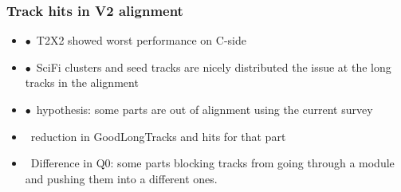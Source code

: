 \documentclass[aspectratio=1610, 12pt]{beamer}
\begin{document}
\begin{frame}\frametitle{Track hits in V2 alignment}
  \begin{itemize}
    \item $\bullet$\, T2X2 showed worst performance on C-side
    \item $\bullet$\, SciFi clusters and seed tracks are nicely distributed \to the issue at the long tracks in the alignment
    \item $\bullet$\, hypothesis: some parts are out of alignment using the current survey
    \item \to\, reduction in GoodLongTracks and hits for that part
    \item \to\, Difference in Q0: some parts blocking tracks from going through a module and pushing them into a different ones.
  \end{itemize}
  \begin{figure}
  \end{figure}
\end{frame}
\end{document}

